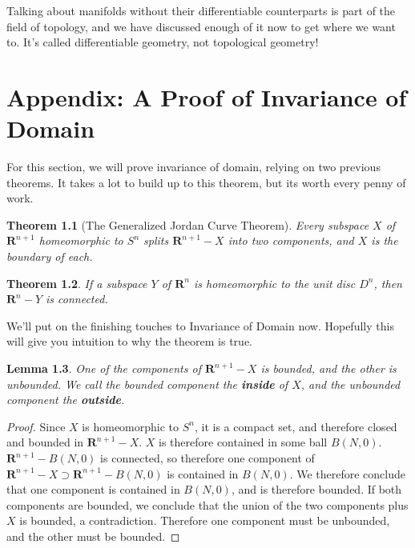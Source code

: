 \documentclass[12pt]{report}
\theoremstyle{plain}
\newtheorem{theorem}{Theorem}[chapter]
\newtheorem{lemma}[theorem]{Lemma}
\theoremstyle{definition}
\begin{document}

Talking about manifolds without their differentiable counterparts is part of the field of topology, and we have discussed enough of it now to get where we want to. It's called differentiable geometry, not topological geometry!

\chapter{Appendix: A Proof of Invariance of Domain}

For this section, we will prove invariance of domain, relying on two previous theorems. It takes a lot to build up to this theorem, but its worth every penny of work.

\begin{theorem}[The Generalized Jordan Curve Theorem]
    Every subspace $X$ of $\mathbf{R}^{n+1}$ homeomorphic to $S^n$ splits $\mathbf{R}^{n+1} - X$ into two components, and $X$ is the boundary of each.
\end{theorem}

\begin{theorem}
    If a subspace $Y$ of $\mathbf{R}^n$ is homeomorphic to the unit disc $D^n$, then $\mathbf{R}^n - Y$ is connected.
\end{theorem}

We'll put on the finishing touches to Invariance of Domain now. Hopefully this will give you intuition to why the theorem is true.

\begin{lemma}
    One of the components of $\mathbf{R}^{n+1} - X$ is bounded, and the other is unbounded. We call the bounded component the {\bf inside} of $X$, and the unbounded component the {\bf outside}.
\end{lemma}
\begin{proof}
    Since $X$ is homeomorphic to $S^n$, it is a compact set, and therefore closed and bounded in $\mathbf{R}^{n+1} - X$. $X$ is therefore contained in some ball $B(N,0)$. $\mathbf{R}^{n+1} - B(N,0)$ is connected, so therefore one component of $\mathbf{R}^{n+1} - X \supset \mathbf{R}^{n+1} - B(N,0)$ is contained in $B(N,0)$. We therefore conclude that one component is contained in $B(N,0)$, and is therefore bounded. If both components are bounded, we conclude that the union of the two components plus $X$ is bounded, a contradiction. Therefore one component must be unbounded, and the other must be bounded.
\end{proof}
\end{document}

